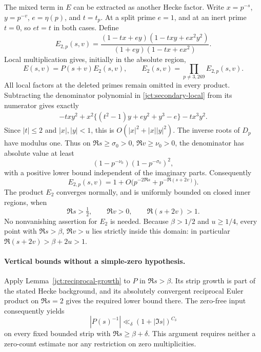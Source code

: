The mixed term in \(E\) can be extracted as another Hecke factor.
Write \(x=p^{-s}\), \(y=p^{-v}\), \(e=\eta(p)\), and \(t=t_p\).
At a split prime \(e=1\), and at an inert prime \(t=0\), so
\(et=t\) in both cases. Define
\begin{equation}
 E_{2,p}(s,v)=
 \frac{(1-tx+ey)(1-txy+ex^2y^2)}
 {(1+ey)(1-tx+ex^2)}.
 \label{jct:secondary-local}
\end{equation}
Local multiplication gives, initially in the absolute region,
\begin{equation}
 E(s,v)=P(s+v)E_2(s,v),\qquad
 E_2(s,v)=\prod_{p\ne3,269}E_{2,p}(s,v).
 \label{jct:secondary-factor}
\end{equation}
All local factors at the deleted primes remain omitted in every
product. Subtracting the denominator polynomial in
\eqref{jct:secondary-local} from its numerator gives exactly
\[
 \begin{split}
 -txy^2+x^2\{(t^2-1)y+ey^2+y^3-e\}-tx^3y^2.
 \end{split}
\]
Since \(|t|\le2\) and \(|x|,|y|<1\), this is
\(O(|x|^2+|x||y|^2)\).
The inverse roots of \(D_p\) have modulus one. Thus on
\(\Re s\ge\sigma_0>0\), \(\Re v\ge\nu_0>0\), the denominator
has absolute value at least
\[
 (1-p^{-\nu_0})(1-p^{-\sigma_0})^2,
\]
with a positive lower bound independent of the imaginary parts.
Consequently
\[
 E_{2,p}(s,v)=1+O\bigl(p^{-2\Re s}+p^{-\Re(s+2v)}\bigr).
\]
The product \(E_2\) converges normally, and is uniformly bounded
on closed inner regions, when
\begin{equation}
 \Re s>\tfrac12,\qquad\Re v>0,\qquad\Re(s+2v)>1.
 \label{jct:secondary-domain}
\end{equation}
No nonvanishing assertion for \(E_2\) is needed. Because
\(\beta>1/2\) and \(u\ge1/4\), every point with
\(\Re s>\beta\), \(\Re v>u\) lies strictly inside this domain:
in particular \(\Re(s+2v)>\beta+2u>1\).

\paragraph{Vertical bounds without a simple-zero hypothesis.}
Apply Lemma~\ref{jct:reciprocal-growth} to \(P\) in
\(\Re s>\beta\). Its strip growth is part of the stated Hecke
background, and its absolutely convergent reciprocal Euler product
on \(\Re s=2\) gives the required lower bound there.
The zero-free input consequently yields
\[
 |P(s)^{-1}|\ll_\delta(1+|\Im s|)^{C_\delta}
\]
on every fixed bounded strip with \(\Re s\ge\beta+\delta\).
This argument requires neither a zero-count estimate nor any
restriction on zero multiplicities.

